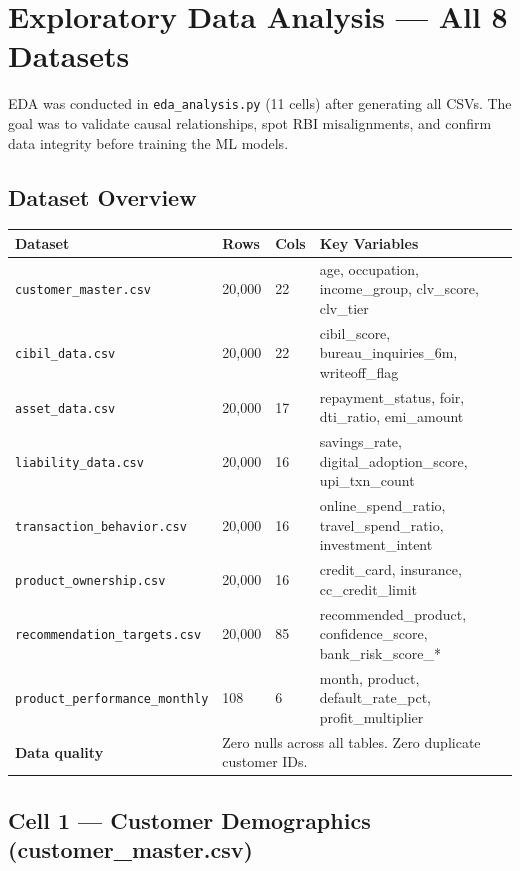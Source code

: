 \documentclass[12pt,a4paper]{article}
\begin{document}
\section{Exploratory Data Analysis — All 8 Datasets}

EDA was conducted in \texttt{eda\_analysis.py} (11 cells) after generating all CSVs. The goal was to validate causal relationships, spot RBI misalignments, and confirm data integrity before training the ML models.

\subsection{Dataset Overview}

\begin{tabular}{llll}
\toprule
\textbf{Dataset} & \textbf{Rows} & \textbf{Cols} & \textbf{Key Variables} \\
\midrule
\texttt{customer\_master.csv}          & 20{,}000 & 22 & age, occupation, income\_group, clv\_score, clv\_tier \\
\texttt{cibil\_data.csv}               & 20{,}000 & 22 & cibil\_score, bureau\_inquiries\_6m, writeoff\_flag \\
\texttt{asset\_data.csv}               & 20{,}000 & 17 & repayment\_status, foir, dti\_ratio, emi\_amount \\
\texttt{liability\_data.csv}           & 20{,}000 & 16 & savings\_rate, digital\_adoption\_score, upi\_txn\_count \\
\texttt{transaction\_behavior.csv}     & 20{,}000 & 16 & online\_spend\_ratio, travel\_spend\_ratio, investment\_intent \\
\texttt{product\_ownership.csv}        & 20{,}000 & 16 & credit\_card, insurance, cc\_credit\_limit \\
\texttt{recommendation\_targets.csv}   & 20{,}000 & 85 & recommended\_product, confidence\_score, bank\_risk\_score\_* \\
\texttt{product\_performance\_monthly} &      108 &  6 & month, product, default\_rate\_pct, profit\_multiplier \\
\midrule
\textbf{Data quality} & \multicolumn{3}{l}{Zero nulls across all tables. Zero duplicate customer IDs.} \\
\bottomrule
\end{tabular}

\subsection{Cell 1 — Customer Demographics (customer\_master.csv)}
\end{document}
